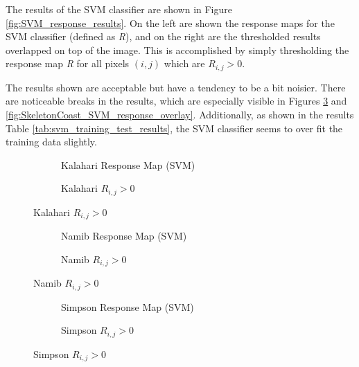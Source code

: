 The results of the SVM classifier are shown in Figure \ref{fig:SVM_response_results}. On the left are shown the response maps for the SVM classifier (defined as \emph{R}), and on the right are the thresholded results overlapped on top of the image. This is accomplished by simply thresholding the response map \emph{R} for all pixels $(i,j)$ which are $R_{i,j} > 0$. 

The results shown are acceptable but have a tendency to be a bit noisier. There are noticeable breaks in the results, which are especially visible in Figures \ref{fig:kalahari_SVM_response_overlay} and \ref{fig:SkeletonCoast_SVM_response_overlay}. Additionally, as shown in the results Table \ref{tab:svm_training_test_results}, the SVM classifier seems to over fit the training data slightly. 
\begin{figure}[H]
	\centering
	\begin{subfigure}{0.48\textwidth}
		\centering
		\caption{Kalahari Response Map (SVM)}
		\label{fig:kalahari_SVM_response}
	\end{subfigure}
	\begin{subfigure}{0.48\textwidth}
		\centering
		\caption{ Kalahari $R_{i,j} > 0$}
		\label{fig:kalahari_SVM_response_overlay}
	\end{subfigure}
\end{figure}
\begin{figure}[H]
	\ContinuedFloat
	\centering
	\begin{subfigure}{0.48\textwidth}
		\centering
		\caption{Namib Response Map (SVM)}
		\label{fig:namib_SVM_response}
	\end{subfigure}
	\begin{subfigure}{0.48\textwidth}
		\centering
		\caption{ Namib $R_{i,j} > 0$}
		\label{fig:namib_SVM_response_overlay}
	\end{subfigure}
\end{figure}
\begin{figure}[H]
	\ContinuedFloat
	\centering
	\begin{subfigure}{0.48\textwidth}
		\centering
		\caption{Simpson Response Map (SVM)}
		\label{fig:simpson_SVM_response}
	\end{subfigure}
	\begin{subfigure}{0.48\textwidth}
		\centering
		\caption{ Simpson $R_{i,j} > 0$}
		\label{fig:simpson_SVM_response_overlay}
	\end{subfigure}
\end{figure}
